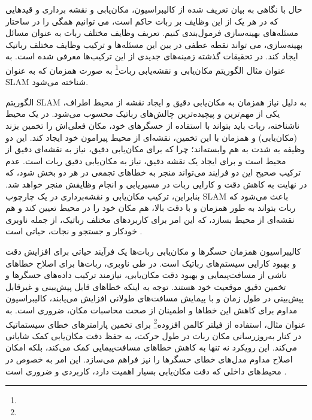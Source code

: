 حال با نگاهی به بیان تعریف شده از کالیبراسیون، مکان‌یابی و نقشه برداری و قید‌هایی که در هر یک از این وظایف بر ربات حاکم است، می توانیم همگی را در ساختار مسئله‌های بهینه‌سازی فرمول‌بندی کنیم. تعریف وظایف مختلف ربات به عنوان مسائل بهینه‌سازی، می تواند نقطه عطفی در بین این مسئله‌ها و ترکیب وظایف مختلف رباتیک ایجاد کند. در تحقیقات گذشته زمینه‌های جدیدی از این ترکیب‌ها معرفی شده است. به عنوان مثال الگوریتم مکان‌یابی و نقشه‌یابی ربات\footnote{}
به صورت همزمان که به عنوان SLAM شناخته می‌شود. 

الگوریتم SLAM به دلیل نیاز همزمان به مکان‌یابی دقیق و ایجاد نقشه از محیط اطراف، یکی از مهم‌ترین و پیچیده‌ترین چالش‌های رباتیک محسوب می‌شود. در یک محیط ناشناخته، ربات باید بتواند با استفاده از حسگرهای خود، مکان فعلی‌اش را تخمین بزند (مکان‌یابی) و همزمان با این تخمین، نقشه‌ای از محیط پیرامون خود ایجاد کند. این دو وظیفه به شدت به هم وابسته‌اند؛ چرا که برای مکان‌یابی دقیق، نیاز به نقشه‌ای دقیق از محیط است و برای ایجاد یک نقشه دقیق، نیاز به مکان‌یابی دقیق ربات است. عدم ترکیب صحیح این دو فرایند می‌تواند منجر به خطاهای تجمعی در هر دو بخش شود، که در نهایت به کاهش دقت و کارایی ربات در مسیریابی و انجام وظایفش منجر خواهد شد. بنابراین، ترکیب مکان‌یابی و نقشه‌برداری در یک چارچوب SLAM باعث می‌شود که ربات بتواند به طور همزمان و با دقت بالا، هم مکان خود را در محیط تعیین کند و هم نقشه‌ای از محیط بسازد، که این امر برای کاربردهای مختلف رباتیک، از جمله ناوبری خودکار و جستجو و نجات، حیاتی است
\cite{grisetti2010tutorial}.

کالیبراسیون همزمان حسگرها و مکان‌یابی ربات‌ها یک فرآیند حیاتی برای افزایش دقت و بهبود کارایی سیستم‌های رباتیک است. در طی ناوبری، ربات‌ها برای اصلاح خطاهای ناشی از مسافت‌پیمایی و بهبود دقت مکان‌یابی، نیازمند ترکیب داده‌های حسگرها و تخمین دقیق موقعیت خود هستند.  توجه به اینکه خطاهای قابل پیش‌بینی و غیرقابل پیش‌بینی در طول زمان و با پیمایش مسافت‌های طولانی افزایش می‌یابند، کالیبراسیون مداوم برای کاهش این خطاها و اطمینان از صحت محاسبات مکان، ضروری است.
 به عنوان مثال، استفاده از فیلتر کالمن افزوده\footnote{}
برای تخمین پارامترهای خطای سیستماتیک در کنار به‌روزرسانی مکان ربات در طول حرکت، به حفظ دقت مکان‌یابی کمک شایانی می‌کند. این رویکرد نه تنها به کاهش خطاهای مسافت‌پیمایی کمک می‌کند، بلکه امکان اصلاح مداوم مدل‌های خطای حسگرها را نیز فراهم می‌سازد. این امر به خصوص در محیط‌های داخلی که دقت مکان‌یابی بسیار اهمیت دارد، کاربردی و ضروری است
\cite{martinelli2007simultaneous}.

